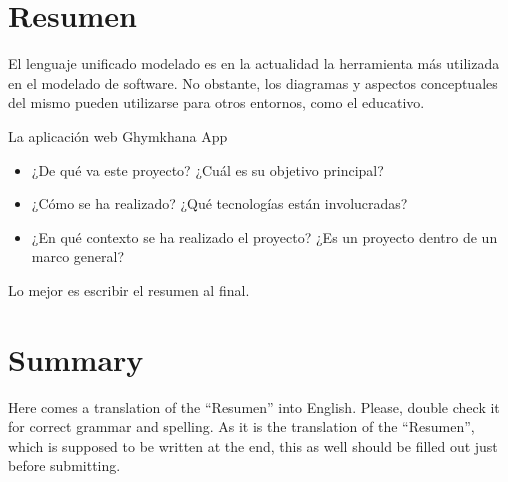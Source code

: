 \documentclass[a4paper, 12pt]{book}
\begin{document}

\chapter*{Resumen}

El lenguaje unificado modelado es en la actualidad la herramienta más utilizada en el modelado de software. No obstante, los diagramas y aspectos conceptuales del mismo pueden utilizarse para otros entornos, como el educativo.  

La aplicación web Ghymkhana App 

\begin{itemize}
  \item ¿De qué va este proyecto? ¿Cuál es su objetivo principal?
  \item ¿Cómo se ha realizado? ¿Qué tecnologías están involucradas?
  \item ¿En qué contexto se ha realizado el proyecto? ¿Es un proyecto dentro de un marco general?
\end{itemize}

Lo mejor es escribir el resumen al final.


\chapter*{Summary}

Here comes a translation of the ``Resumen'' into English. 
Please, double check it for correct grammar and spelling.
As it is the translation of the ``Resumen'', which is supposed to be written at the end, this as well should be filled out just before submitting.



\end{document}
